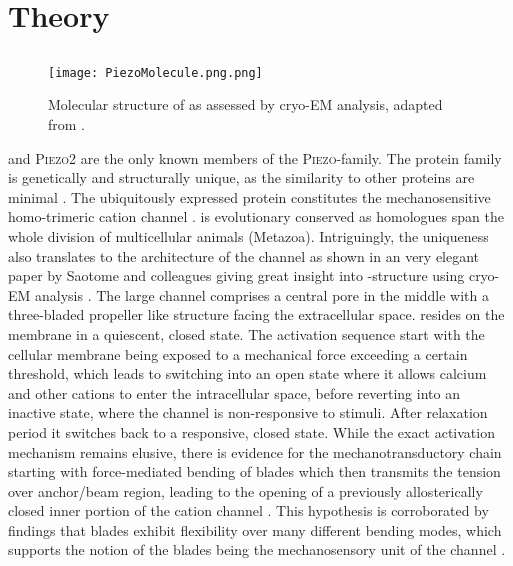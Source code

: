\section{Theory}

\subsection{\Piezo{}}


\begin{figure}
	\centering
	\texttt{[image: PiezoMolecule.png.png]}
	\caption{Molecular structure of \Piezo{} as assessed by cryo-EM analysis, adapted from \cite{Saotome2018, Zhao2018}.}
	\label{pic:Piezo}
\end{figure}



\Piezo{} and \textsc{Piezo2} are the only known members of the \textsc{Piezo}-family. 
The protein family is genetically and structurally unique, as the similarity to other proteins are minimal \cite{Coste2010}. 
The ubiquitously expressed protein \Piezo{} constitutes the mechanosensitive homo-trimeric cation channel \Piezo{} \cite{Zhao2018}. \Piezo{} is evolutionary conserved as homologues span the whole division of multicellular animals (Metazoa). Intriguingly, the uniqueness also translates to the architecture of the channel as shown in an very elegant paper by Saotome and colleagues giving great insight into \Piezo{}-structure using cryo-EM analysis \cite{Saotome2018}. The large channel comprises a central pore in the middle with a three-bladed propeller like structure facing the extracellular space. \Piezo{} resides on the membrane in a quiescent, closed state. The activation sequence start with the cellular membrane being exposed to a mechanical force exceeding a certain threshold, which leads to \Piezo{} switching into an open state where it allows calcium and other cations to enter the intracellular space, before reverting into an inactive state, where the channel is non-responsive to stimuli. After relaxation period it switches back to a responsive, closed state. While the exact activation mechanism remains elusive, there is evidence for the mechanotransductory chain starting with force-mediated bending of blades which then transmits the tension over anchor/beam region, leading to the opening of a previously allosterically closed inner portion of the cation channel \cite{Zhao2018}. This hypothesis is corroborated by findings that blades exhibit flexibility over many different bending modes, which supports the notion of the blades being the mechanosensory unit of the channel \cite{Ge2015}. 
